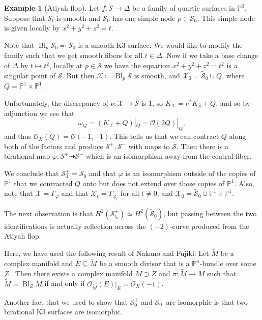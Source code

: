 \documentclass[leqno, openany]{memoir}
\theoremstyle{definition}
\newtheorem{exm}[thm]{Example}
\theoremstyle{remark}
\theoremstyle{plain}
\theoremstyle{definition}
\theoremstyle{remark}
\renewcommand{\P}{\mathbb{P}}
\newcommand{\mc}[1]{\mathcal{#1}}
\newcommand{\ol}[1]{\overline{#1}}
\newcommand{\wt}[1]{\widetilde{#1}}
\DeclareMathOperator{\Bl}{Bl}
\begin{document}
\begin{exm}[Atiyah flop]
    Let $f \colon \mc{S} \to \Delta$ be a family of quartic surfaces in $\P^3$. Suppose that $\mc{S}_t$ is smooth and $\mc{S}_0$ has one simple node $p \in \mc{S}_0$. This simple node is given locally by $x^2 + y^2 + z^2 = t$.

    Note that $\Bl_p \mc{S}_0 \eqqcolon \wt{\mc{S}}_0$ is a smooth K3 surface. We would like to modify the family such that we get smooth fibers for all $t \in \Delta$. Now if we take a base change of $\Delta$ by $t \mapsto t^2$, locally at $p \in \ol{\mc{S}}$ we have the equation $x^2 + y^2 + z^2 = t^2$ is a singular point of $\ol{\mc{S}}$. But then $\mc{X} \coloneqq \Bl_p \ol{\mc{S}}$ is smooth, and $\mc{X}_0 = \wt{\mc{S}}_0 \cup Q$, where $Q = \P^1 \times \P^1$.

    Unfortunately, the discrepancy of $\nu \colon \mc{X} \to \ol{\mc{S}}$ is $1$, so $K_{\mc{X}} = \nu^* K_{\ol{\mc{S}}} + Q$, and so by adjunction we see that
    \[ \omega_Q = (K_{\mc{X}} + Q)|_Q = \mc{O}(2Q)|_Q, \]
    and thus $\mc{O}_X(Q) = \mc{O}(-1,-1)$. This tells us that we can contract $Q$ along both of the factors and produce $\mc{S}^+, \mc{S}^-$ with maps to $\ol{\mc{S}}$. Then there is a birational map $\varphi \colon \mc{S}^+ \dashrightarrow \mc{S}^-$ which is an isomorphism away from the central fiber.

    We conclude that $\mc{S}_0^{\pm} = \wt{\mc{S}}_0$ and that $\varphi$ is an isomorphism outside of the copies of $\P^1$ that we contracted $Q$ onto but does not extend over those copies of $\P^1$. Also, note that $\mc{X} = \Gamma_{\varphi}$ and that $\mc{X}_t = \Gamma_{\varphi_t}$ for all $t \neq 0$, and $\mc{X}_0 = \wt{\mc{S}}_0 \cup \P^1 \times \P^1$.

    The next observation is that $H^2(\mc{S}^{\pm}_{t_0}) \simeq H^2(\wt{\mc{S}}_0)$, but passing between the two identifications is actually reflection across the $(-2)$-curve produced from the Atiyah flop.
\end{exm}

Here, we have used the following result of Nakano and Fujiki: Let $\wt{M}$ be a complex manifold and $E \subseteq \wt{M}$ be a smooth divisor that is a $\P^n$-bundle over some $Z$.. Then there exists a complex manifold $M \supset Z$ and $\pi \colon \wt{M} \to M$ such that $\wt{M} = \Bl_Z M$ if and only if $\mc{O}_{\wt{M}}(E)|_E = \mc{O}_X(-1)$.

Another fact that we used to show that $\mc{S}_0^+$ and $\mc{S}_0^-$ are isomorphic is that two birational K3 surfaces are isomorphic.
\end{document}
